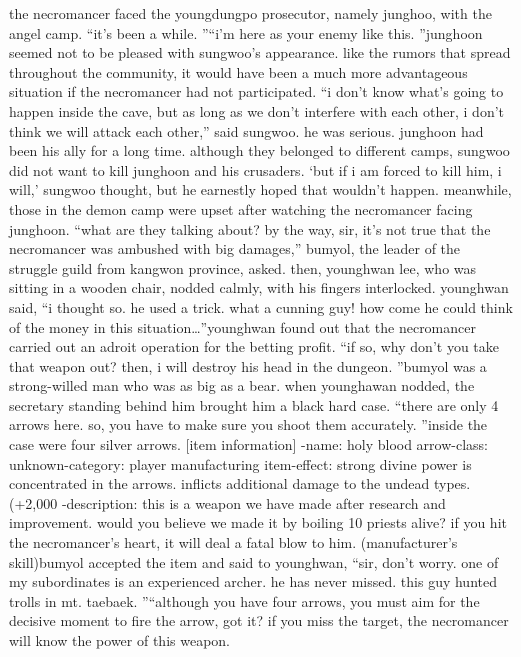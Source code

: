 the necromancer faced the youngdungpo prosecutor, namely junghoo, with the angel camp.
“it’s been a while.
”“i’m here as your enemy like this.
”junghoon seemed not to be pleased with sungwoo’s appearance.
like the rumors that spread throughout the community, it would have been a much more advantageous situation if the necromancer had not participated.
“i don’t know what’s going to happen inside the cave, but as long as we don’t interfere with each other, i don’t think we will attack each other,” said sungwoo.
he was serious.
 junghoon had been his ally for a long time.
 although they belonged to different camps, sungwoo did not want to kill junghoon and his crusaders.
‘but if i am forced to kill him, i will,’ sungwoo thought, but he earnestly hoped that wouldn’t happen.
meanwhile, those in the demon camp were upset after watching the necromancer facing junghoon.
“what are they talking about? by the way, sir, it’s not true that the necromancer was ambushed with big damages,” bumyol, the leader of the struggle guild from kangwon province, asked.
then, younghwan lee, who was sitting in a wooden chair, nodded calmly, with his fingers interlocked.
younghwan said, “i thought so.
 he used a trick.
 what a cunning guy! how come he could think of the money in this situation…”younghwan found out that the necromancer carried out an adroit operation for the betting profit.
“if so, why don’t you take that weapon out? then, i will destroy his head in the dungeon.
”bumyol was a strong-willed man who was as big as a bear.
 when younghawan nodded, the secretary standing behind him brought him a black hard case.
“there are only 4 arrows here.
 so, you have to make sure you shoot them accurately.
”inside the case were four silver arrows.
[item information]
-name: holy blood arrow-class: unknown-category: player manufacturing item-effect: strong divine power is concentrated in the arrows.
 inflicts additional damage to the undead types.
 (+2,000%
-description: this is a weapon we have made after research and improvement.
 would you believe we made it by boiling 10 priests alive? if you hit the necromancer’s heart, it will deal a fatal blow to him.
 (manufacturer’s skill)bumyol accepted the item and said to younghwan, “sir, don’t worry.
 one of my subordinates is an experienced archer.
 he has never missed.
 this guy hunted trolls in mt.
 taebaek.
”“although you have four arrows, you must aim for the decisive moment to fire the arrow, got it? if you miss the target, the necromancer will know the power of this weapon.
